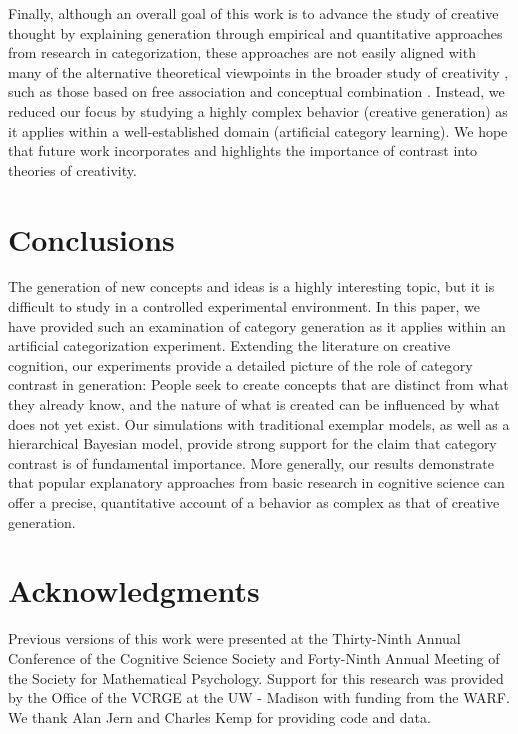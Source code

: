 \documentclass[12pt]{article}
\begin{document}
\begin{flushleft}
Finally, although an overall goal of this work is to advance the study of
creative thought by explaining generation through empirical and quantitative
approaches from research in categorization, these approaches are not easily
aligned with many of the alternative theoretical viewpoints in the broader study
of creativity \citep[for a review see][]{kozbelt2010theories}, such as those
based on free association \citep{mednick1962associative} and conceptual
combination \citep{estes2002emergence,murphy1988comprehending}. Instead, we
reduced our focus by studying a highly complex behavior (creative generation) as
it applies within a well-established domain (artificial category learning). We
hope that future work incorporates and highlights the importance of contrast
into theories of creativity.



\section{Conclusions}

The generation of new concepts and ideas is a highly interesting topic, but it
is difficult to study in a controlled experimental environment. In this paper,
we have provided such an examination of category generation as it applies within
an artificial categorization experiment. Extending the literature on creative
cognition, our experiments provide a detailed picture of the role of category
contrast in generation: People seek to create concepts that are distinct from
what they already know, and the nature of what is created can be influenced by
what does not yet exist. Our simulations with traditional exemplar models, as
well as a hierarchical Bayesian model, provide strong support for the claim that
category contrast is of fundamental importance. More generally, our results
demonstrate that popular explanatory approaches from basic research in cognitive
science can offer a precise, quantitative account of a behavior as complex as
that of creative generation.


\clearpage
\section{Acknowledgments} Previous versions of this work were presented at the
Thirty-Ninth Annual Conference of the Cognitive Science Society and Forty-Ninth
Annual Meeting of the Society for Mathematical Psychology. Support for this
research was provided by the Office of the VCRGE at the UW - Madison with
funding from the WARF. We thank Alan Jern and Charles Kemp for providing code
and data.
\end{flushleft}
\end{document}
